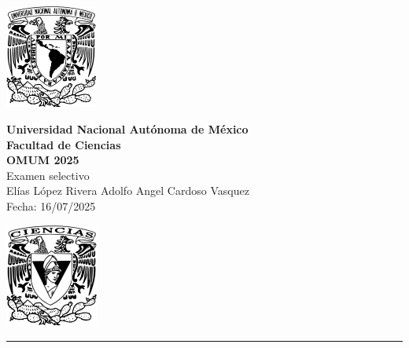 \documentclass[11pt,letterpaper]{article}
\begin{document}

\begin{center}
    \begin{minipage}{3cm}
    	\begin{center}
    		\includegraphics[height=3.4cm]{logo_unam.png}
    	\end{center}
    \end{minipage}\hfill
    \begin{minipage}{10cm}
    	\begin{center}
    	\textbf{\large Universidad Nacional Autónoma de México}\\[0.1cm]
        \textbf{Facultad de Ciencias}\\[0.1cm]
        \textbf{OMUM 2025}\\[0.1cm]
        Examen selectivo\\[0.1cm]
         El\'ias L\'opez Rivera\,\,Adolfo Angel Cardoso Vasquez\\[0.1cm]
        Fecha:\,\,16/07/2025
    	\end{center}
    \end{minipage}\hfill
    \begin{minipage}{3cm}
    	\begin{center}
    		\includegraphics[height=3.4cm]{Logo_FC.png}
    	\end{center}
    \end{minipage}
\end{center}

\rule{17cm}{0.1mm}
\end{document}
